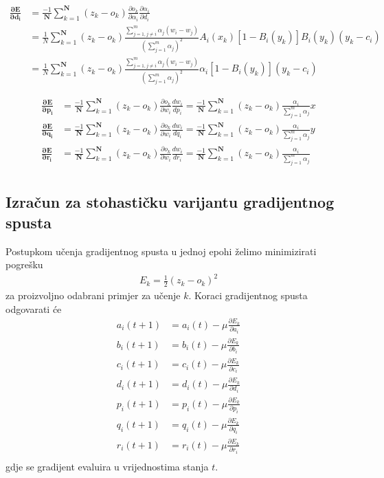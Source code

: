 \documentclass[paper=a4, fontsize=11pt]{scrartcl} %
\numberwithin{equation}{section} %
\numberwithin{figure}{section} %
\numberwithin{table}{section} %
\begin{document}
\begin{align*}
\mathbf{\frac{\partial E}{\partial d_i}} &= \frac{-1}{\mathbf{N}} \sum_{k=1}^{\mathbf{N}} (z_k - o_k) \frac{\partial o_k}{\partial\alpha_i} \frac{\partial \alpha_i}{\partial d_i} 
\\ &= \frac{1}{N}\sum_{k=1}^{\mathbf{N}} (z_k - o_k) \frac{\sum_{j = 1, j \neq i}^{m} \alpha_j (w_i - w_j)}{(\sum_{j=1}^{m} \alpha_j)^2 } A_i(x_k)[1 -B_i(y_k)]B_i(y_k)(y_k - c_i)\\ &= 
\frac{1}{N}\sum_{k=1}^{\mathbf{N}} (z_k - o_k) \frac{\sum_{j = 1, j \neq i}^{m} \alpha_j (w_i - w_j)}{(\sum_{j=1}^{m} \alpha_j)^2 } \alpha_i [1 - B_i(y_k)](y_k - c_i)
\end{align*}

\begin{align*}
\mathbf{\frac{\partial E}{\partial p_i}} &= \frac{-1}{\mathbf{N}} \sum_{k=1}^{\mathbf{N}} (z_k - o_k) \frac{\partial o_k}{\partial w_i} \frac{dw_i}{dp_i} = \frac{-1}{\mathbf{N}} \sum_{k=1}^{\mathbf{N}} (z_k - o_k) \frac{\alpha_i}{\sum_{j=1}^{m} \alpha_j} x \\
\mathbf{\frac{\partial E}{\partial q_i}} &= \frac{-1}{\mathbf{N}} \sum_{k=1}^{\mathbf{N}} (z_k - o_k) \frac{\partial o_k}{\partial w_i} \frac{dw_i}{dq_i} = \frac{-1}{\mathbf{N}} \sum_{k=1}^{\mathbf{N}} (z_k - o_k) \frac{\alpha_i}{\sum_{j=1}^{m} \alpha_j} y \\
\mathbf{\frac{\partial E}{\partial r_i}} &= \frac{-1}{\mathbf{N}} \sum_{k=1}^{\mathbf{N}} (z_k - o_k) \frac{\partial o_k}{\partial w_i} \frac{dw_i}{dr_i} = \frac{-1}{\mathbf{N}} \sum_{k=1}^{\mathbf{N}} (z_k - o_k) \frac{\alpha_i}{\sum_{j=1}^{m} \alpha_j} \\
\end{align*}

\subsection{Izračun za stohastičku varijantu gradijentnog spusta} 
Postupkom učenja gradijentnog spusta u jednoj epohi želimo minimizirati pogrešku 
\begin{align*}
E_k = \frac{1}{2} (z_k - o_k)^2
\end{align*} za proizvoljno odabrani primjer za učenje $k$.
Koraci gradijentnog spusta odgovarati će
\begin{align*}
a_i(t+1) &= a_i(t) - \mu  \frac{\partial E_k}{\partial a_i}  \\
b_i(t+1) &= b_i(t) - \mu  \frac{\partial E_k}{\partial b_i}  \\
c_i(t+1) &= c_i(t) - \mu  \frac{\partial E_k}{\partial c_i}  \\
d_i(t+1) &= d_i(t) - \mu  \frac{\partial E_k}{\partial d_i}  \\
p_i(t+1) &= p_i(t) - \mu  \frac{\partial E_k}{\partial p_i}  \\
q_i(t+1) &= q_i(t) - \mu  \frac{\partial E_k}{\partial q_i}  \\
r_i(t+1) &= r_i(t) - \mu  \frac{\partial E_k}{\partial r_i}  \\
\end{align*} 
gdje se gradijent evaluira u vrijednostima stanja $t$.
\end{document}
